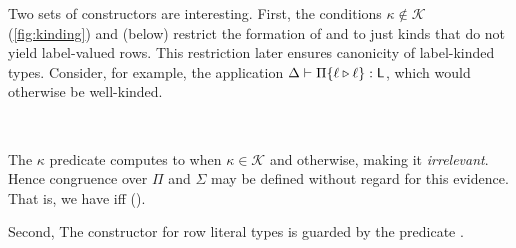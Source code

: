 \documentclass[sigplan,screen]{acmart}
\begin{document}
\begin{AgdaAlign}
Two sets of  constructors are interesting. First, the conditions $\kappa \notin \mathcal K$ (\cref{fig:kinding}) and  (below) restrict the formation of  and  to just kinds that do not yield label-valued rows. This restriction later ensures canonicity of label-kinded types. Consider, for example, the application $\Delta \vdash \Pi \{\ell \triangleright \ell\} : \mathsf{L}$, which would otherwise be well-kinded.

\begin{code} %
\>[2][@{}l@{\AgdaIndent{1}}]%
\>[4]%
\>[10]\AgdaSymbol{:}\AgdaSpace{}%
\AgdaSymbol{\{}\AgdaSpace{}%
\AgdaSymbol{:}\AgdaSpace{}%
\AgdaSpace{}%
\AgdaSymbol{\}}\AgdaSpace{}%
\AgdaSpace{}%
\AgdaSpace{}%
\AgdaSpace{}%
\AgdaSymbol{(}\AgdaOperator{\AgdaInductiveConstructor{R[}}\AgdaSpace{}%
\AgdaSpace{}%
\AgdaOperator{\AgdaInductiveConstructor{]}}\AgdaSpace{}%
\AgdaSpace{}%
\AgdaSymbol{)}\<%
\\
%
\>[4]%
\>[10]\AgdaSymbol{:}\AgdaSpace{}%
\AgdaSymbol{\{}\AgdaSpace{}%
\AgdaSymbol{:}\AgdaSpace{}%
\AgdaSpace{}%
\AgdaSymbol{\}}\AgdaSpace{}%
\AgdaSpace{}%
\AgdaSpace{}%
\AgdaSpace{}%
\AgdaSymbol{(}\AgdaOperator{\AgdaInductiveConstructor{R[}}\AgdaSpace{}%
\AgdaSpace{}%
\AgdaOperator{\AgdaInductiveConstructor{]}}\AgdaSpace{}%
\AgdaSpace{}%
\AgdaSymbol{)}\<%
\end{code}

 The  $\kappa$ predicate computes to  when $\kappa \in \mathcal K$ and  otherwise, making it \emph{irrelevant}. Hence congruence over $\Pi$ and $\Sigma$ may be defined without regard for this evidence. That is, we have  \Symbol{\{}\Symbol{\}}    \Symbol{\{}\Symbol{\}}  iff    ().

Second, The constructor  for row literal types is guarded by the predicate  \Symbol{(} \Symbol{)}.


\end{AgdaAlign}
\end{document}
